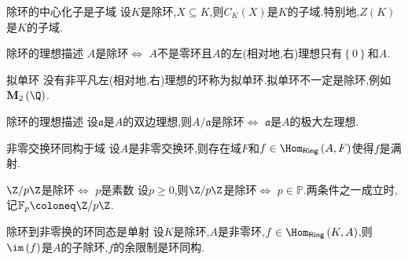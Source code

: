 \begin{proposition}{除环的中心化子是子域}{}
	设$K$是除环,$X\subseteq K$,则$C_{K}\left(X\right)$是$K$的子域.特别地,$Z\left(K\right)$是$K$的子域.
\end{proposition}

\begin{theorem}{除环的理想描述}{}
	$A$是除环$\iff$ $A$不是零环且$A$的左(相对地,右)理想只有$\left\{0\right\}$和$A$.
\end{theorem}

\begin{remark}{拟单环}{}
	没有非平凡左(相对地,右)理想的环称为拟单环.拟单环不一定是除环,例如$\mathbf{M}_{2}\left(\Q\right)$.
\end{remark}

\begin{corollary}{除环的理想描述}{}
	设$\mathfrak{a}$是$A$的双边理想,则$A/\mathfrak{a}$是除环$\iff$ $\mathfrak{a}$是$A$的极大左理想.
\end{corollary}

\begin{corollary}{非零交换环同构于域}{}
	设$A$是非零交换环,则存在域$F$和$f\in\Hom_{\mathsf{Ring}}\left(A,F\right)$使得$f$是满射.
\end{corollary}

\begin{corollary}{$\Z/p\Z$是除环$\iff$ $p$是素数}{}
	设$p\geq 0$,则$\Z/p\Z$是除环$\iff$ $p\in\mathbb{P}$.两条件之一成立时,记$\mathbb{F}_{p}\coloneq\Z/p\Z$.
\end{corollary}

\begin{theorem}{除环到非零换的环同态是单射}{}
	设$K$是除环,$A$是非零环,$f\in\Hom_{\mathsf{Ring}}\left(K,A\right)$,则$\im\left(f\right)$是$A$的子除环,$f$的余限制是环同构.
\end{theorem}






















